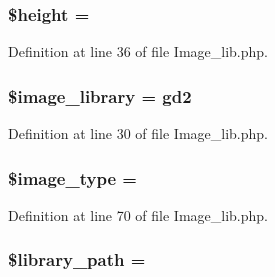 \subsubsection[{\texorpdfstring{\$height}{$height}}]{\setlength{\rightskip}{0pt plus 5cm}\${\bf height} = \textquotesingle{}\textquotesingle{}}\hypertarget{class_c_i___image__lib_a2c265bba1724371bb03e6901297c30b2}{}\label{class_c_i___image__lib_a2c265bba1724371bb03e6901297c30b2}


Definition at line 36 of file Image\+\_\+lib.\+php.

\subsubsection[{\texorpdfstring{\$image\+\_\+library}{$image_library}}]{\setlength{\rightskip}{0pt plus 5cm}\$image\+\_\+library = \textquotesingle{}gd2\textquotesingle{}}\hypertarget{class_c_i___image__lib_ac4b224358e1169eec8db344bcb3186c0}{}\label{class_c_i___image__lib_ac4b224358e1169eec8db344bcb3186c0}


Definition at line 30 of file Image\+\_\+lib.\+php.

\subsubsection[{\texorpdfstring{\$image\+\_\+type}{$image_type}}]{\setlength{\rightskip}{0pt plus 5cm}\$image\+\_\+type = \textquotesingle{}\textquotesingle{}}\hypertarget{class_c_i___image__lib_a939d6733d998cce893403d2f59f40317}{}\label{class_c_i___image__lib_a939d6733d998cce893403d2f59f40317}


Definition at line 70 of file Image\+\_\+lib.\+php.

\subsubsection[{\texorpdfstring{\$library\+\_\+path}{$library_path}}]{\setlength{\rightskip}{0pt plus 5cm}\$library\+\_\+path = \textquotesingle{}\textquotesingle{}}\hypertarget{class_c_i___image__lib_ac09f7fc802884aae2149f1df0e53f17a}{}\label{class_c_i___image__lib_ac09f7fc802884aae2149f1df0e53f17a}


